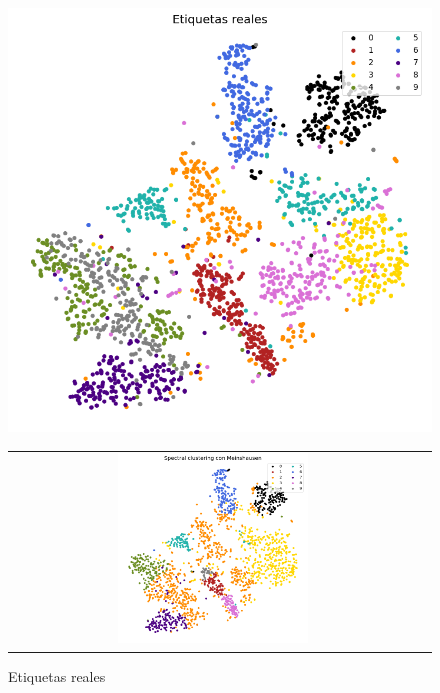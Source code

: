 \documentclass{article}
\begin{document}
\begin{figure}[htb]
    \centering
    \begin{minipage}[t]{0.45\textwidth}
        \vspace{0pt}
        \centering
        \includegraphics[width=\textwidth]{imagenes/mnist/mnist_real_labels.png}
        \caption*{Etiquetas reales}
    \end{minipage}
    \hfill
    \begin{minipage}[t]{0.53\textwidth}
        \vspace{0pt}
        \centering
        \begin{tabular}{cc}
            \includegraphics[width=0.48\textwidth]{imagenes/mnist/mnist_clustering_meinshausen.png} &

\end{tabular}
\end{minipage}
\end{figure}
\end{document}
